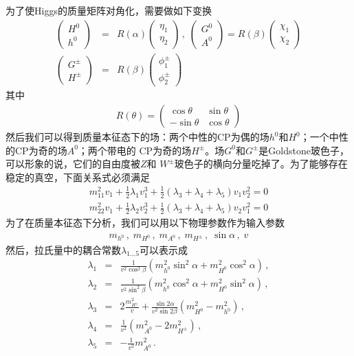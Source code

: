 为了使Higgs的质量矩阵对角化，需要做如下变换
\begin{eqnarray}
\left(\begin{array}{c}H^0 \\ h^0 \end{array}\right) &=& R(\alpha)
\left(\begin{array}{c}\eta_1 \\ \eta_2 \end{array}\right) \,,\;
\left(\begin{array}{c}G^0 \\ A^0 \end{array}\right) = R(\beta)
\left(\begin{array}{c}\chi_1 \\ \chi_2 \end{array}\right)
\nonumber \\
\left(\begin{array}{c}G^{\pm} \\ H^{\pm} \end{array}\right) &=& R(\beta)
\left(\begin{array}{c}\phi^{\pm}_1 \\ \phi^{\pm}_2 \end{array}\right)
\end{eqnarray}
其中
\begin{eqnarray}
R(\theta) = \left(\begin{array}{cc}\cos\theta & \sin\theta \\ -\sin\theta & \cos\theta \end{array}\right)
\end{eqnarray}
然后我们可以得到质量本征态下的场：两个中性的CP为偶的场$h^0$和$H^0$；一个中性的CP为奇的场$A^0$；两个带电的
CP为奇的场$H^{\pm}$。场$G^0$和$G^{\pm}$是Goldstone玻色子，可以形象的说，它们的自由度被$Z$和
$W^{\pm}$玻色子的横向分量吃掉了。为了能够存在稳定的真空，下面关系式必须满足
\begin{eqnarray}
m^2_{11}v_1 + \frac{1}{2}\lambda_1 v^3_1 + \frac{1}{2}(\lambda_3 + \lambda_4 + \lambda_5)v_1 v^2_2 = 0
\nonumber \\
m^2_{22}v_1 + \frac{1}{2}\lambda_2 v^3_2 + \frac{1}{2}(\lambda_3 + \lambda_4 + \lambda_5)v_2 v^2_1 = 0
\end{eqnarray}
为了在质量本征态下分析，我们可以用以下物理参数作为输入参数
\begin{eqnarray}
m_{h^0}\,,\; m_{H^0}\,,\; m_{A^0}\,,\; m_{H^{\pm}}\,,\; \sin\alpha\,,\; v
\end{eqnarray}
然后，拉氏量中的耦合常数$\lambda_{1...5}$可以表示成
\begin{eqnarray}
\lambda_1 &=& \frac{1}{v^2\cos^2\beta}(m^2_{h^0}\sin^2\alpha + m^2_{H^0}\cos^2\alpha)\,,
\nonumber \\
\lambda_2 &=& \frac{1}{v^2\sin^2\beta}(m^2_{h^0}\cos^2\alpha + m^2_{H^0}\sin^2\alpha)\,,
\nonumber \\
\lambda_3 &=& 2\frac{m^2_{H^{\pm}}}{v} + \frac{\sin2\alpha}{v^2\sin2\beta}(m^2_{H^0}-m^2_{h^0})\,,
\nonumber \\
\lambda_4 &=& \frac{1}{v^2} (m^2_{A^0} - 2m^2_{H^{\pm}})\,,
\nonumber \\
\lambda_5 &=& -\frac{1}{v^2}m^2_{A^0}\,.
\label{eqn:2HDMlammass}
\end{eqnarray}

